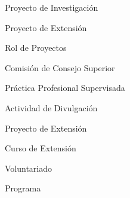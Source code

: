 \item Proyecto de Investigación
\item Proyecto de Extensión
\item Rol de Proyectos
\item Comisión de Consejo Superior
\item Práctica Profesional Supervisada
\item Actividad de Divulgación
\item Proyecto de Extensión
\item Curso de Extensión
\item Voluntariado
\item Programa
